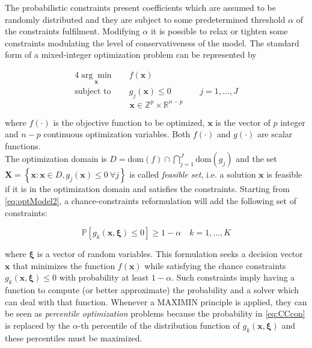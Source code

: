 The probabilistic constraints present coefficients which are assumed to be randomly distributed and they are subject to some predetermined threshold $\alpha$ of the constraints fulfilment.
Modifying $\alpha$ it is possible to relax or tighten some constraints modulating the level of conservativeness of the model.
The standard form of a mixed-integer optimization problem can be represented by  

		\begin{alignat}{4}\label{eq:optModel2}	\underset{\mathbf{x}}{\arg \min} \quad & f(\mathbf{x}) &&\quad  & \\
	\nonumber
	\text{subject to} \quad & g_j(\mathbf{x}) \leq 0 &&\quad & j=1,\ldots,J
	\end{alignat}
	\begin{equation}\nonumber
		 \mathbf{x} \in \mathbb{Z}^p \times \mathbb{R}^{n-p}   
	\end{equation}

where $f(\cdot)$ is the objective function to be optimized, $\mathbf{x}$ is the vector of $p$ integer and $n-p$ continuous optimization variables. Both $f(\cdot)$ and $g(\cdot)$ are scalar functions.\\
The optimization domain is $D=\text{dom}(f) \cap \bigcap_{j=1}^J \text{dom}(g_j)$ and the set \\ $\mathbf{X}=\left\{\mathbf{x} : \mathbf{x} \in D, g_j(\mathbf{x}) \leq 0 \ \forall j \right\}$ is called \emph{feasible set}, i.e. a solution $\mathbf{x}$ is feasible if it is in the optimization domain and satisfies the constraints. Starting from \eqref{eq:optModel2}, a chance-constraints reformulation will add the following set of constraints:

\begin{equation}\label{eq:CCcon}
\mathbb{P}\left[g_k(\mathbf{x},\boldsymbol{\xi})\leq 0\right] \geq 1-\alpha \quad k=1,\ldots,K
\end{equation}

where $\boldsymbol{\xi}$ is a vector of random variables. This formulation seeks a decision vector $\mathbf{x}$  that minimizes the function $f(\mathbf{x})$ while satisfying the chance constraints $g_k(\mathbf{x},\boldsymbol{\xi})\leq 0$ with probability at least $1-\alpha$. Such constraints imply having a function to compute (or better approximate) the probability and a solver which can deal with that function. Whenever a MAXIMIN principle is applied, they can be seen as \emph{percentile optimization} problems \parencite{krokhmal2002portfolio} because the probability in \eqref{eq:CCcon} is replaced by the $\alpha$-th percentile of the distribution function of $g_k(\mathbf{x},\boldsymbol{\xi})$ and these percentiles must be maximized.

